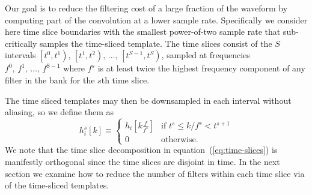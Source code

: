 Our goal is to reduce the filtering cost of a
large fraction of the waveform by computing part of the convolution at a lower
sample rate.  Specifically we consider here time slice boundaries with the
smallest power-of-two sample rate that sub-critically samples the time-sliced
template.  The time slices consist of the $S$ intervals
$\left[t^0, t^1\right),\, \left[t^1, t^2\right),\, \dots,\, \left[t^{S-1}, t^S\right)$,
sampled at frequencies $f^0,\, f^1,\, \dots,\, f^\mathrm{S-1}$ where $f^s$ is at
least twice the highest frequency component of any filter in the bank for the $s$th
time slice.

The time sliced templates may then be downsampled in each interval without
aliasing, so we define them as
%
\begin{equation}
\label{eq:time-sliced-templates}
h_{i}^{s}[k] \equiv
	\begin{cases}
		h_{i}\!\left[k\frac{f}{f^s}\right] & \textrm{if } t^s \leqslant k/f^s < t^{s+1} \\
		0 & \textrm{otherwise.}
	\end{cases}
\end{equation}
%
We note that the time slice decomposition in equation~(\ref{eq:time-slices}) is
manifestly orthogonal since the time slices are disjoint in time.  In the next
section we examine how to reduce the number of filters within each time slice
via \SVD{} of the time-sliced templates.

